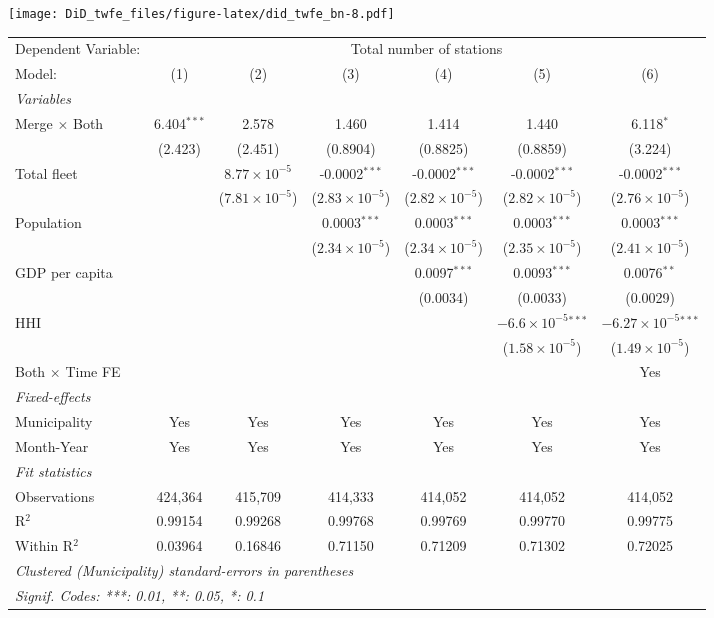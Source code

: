 \documentclass[
]{article}
\begin{document}
\texttt{[image: DiD\_twfe\_files/figure-latex/did\_twfe\_bn-8.pdf]}

\begin{tabular}{lcccccc}
\tabularnewline\midrule\midrule
Dependent Variable:&\multicolumn{6}{c}{Total number of stations}\\
Model:&(1) & (2) & (3) & (4) & (5) & (6)\\
\midrule \emph{Variables}&   &   &   &   &   &  \\
Merge $\times $ Both & 6.404$^{***}$ & 2.578 & 1.460 & 1.414 & 1.440 & 6.118$^{*}$\\
  &(2.423) & (2.451) & (0.8904) & (0.8825) & (0.8859) & (3.224)\\
Total fleet &    & $8.77\times 10^{-5}$ & -0.0002$^{***}$ & -0.0002$^{***}$ & -0.0002$^{***}$ & -0.0002$^{***}$\\
  &   & ($7.81\times 10^{-5}$) & ($2.83\times 10^{-5}$) & ($2.82\times 10^{-5}$) & ($2.82\times 10^{-5}$) & ($2.76\times 10^{-5}$)\\
Population &    &    & 0.0003$^{***}$ & 0.0003$^{***}$ & 0.0003$^{***}$ & 0.0003$^{***}$\\
  &   &    & ($2.34\times 10^{-5}$) & ($2.34\times 10^{-5}$) & ($2.35\times 10^{-5}$) & ($2.41\times 10^{-5}$)\\
GDP per capita &    &    &    & 0.0097$^{***}$ & 0.0093$^{***}$ & 0.0076$^{**}$\\
  &   &    &    & (0.0034) & (0.0033) & (0.0029)\\
HHI &    &    &    &    & $-6.6\times 10^{-5}$$^{***}$ & $-6.27\times 10^{-5}$$^{***}$\\
  &   &    &    &    & ($1.58\times 10^{-5}$) & ($1.49\times 10^{-5}$)\\
Both $\times$ Time FE &  &  &  &  &  & Yes\\
\midrule \emph{Fixed-effects}&   &   &   &   &   &  \\
Municipality & Yes & Yes & Yes & Yes & Yes & Yes\\
Month-Year & Yes & Yes & Yes & Yes & Yes & Yes\\
\midrule \emph{Fit statistics}&  & & & & & \\
Observations & 424,364&415,709&414,333&414,052&414,052&414,052\\
R$^2$ & 0.99154&0.99268&0.99768&0.99769&0.99770&0.99775\\
Within R$^2$ & 0.03964&0.16846&0.71150&0.71209&0.71302&0.72025\\
\midrule\midrule\multicolumn{7}{l}{\emph{Clustered (Municipality) standard-errors in parentheses}}\\
\multicolumn{7}{l}{\emph{Signif. Codes: ***: 0.01, **: 0.05, *: 0.1}}\\
\end{tabular}
\end{document}
